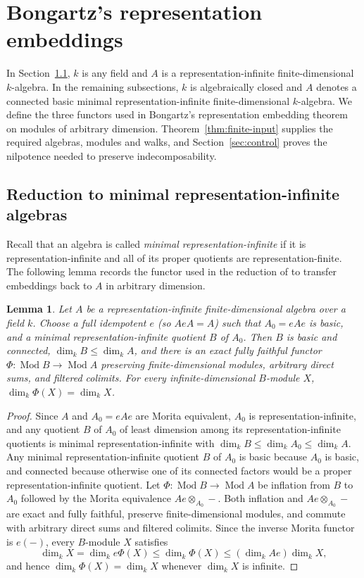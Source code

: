 \documentclass[a4paper,reqno,10pt]{amsart}
\newtheorem{lemma}[theorem]{Lemma}
\theoremstyle{definition}
\DeclareMathOperator{\Mod}{Mod}
\newcommand{\dm}{\dim_k}
\numberwithin{equation}{section}
\begin{document}
\section{Bongartz's representation embeddings}
\label{sec:constructions}
In Section~\ref{sec:reduction}, $k$ is any field and $A$ is a
representation-infinite finite-dimensional $k$-algebra. In the remaining
subsections, $k$ is algebraically closed and $A$ denotes a connected basic
minimal representation-infinite finite-dimensional $k$-algebra.
We define the three functors used in Bongartz's representation embedding
theorem \cite[Theorem~6]{Bongartz} on modules of arbitrary dimension.
Theorem~\ref{thm:finite-input} supplies the required algebras, modules and walks, and
Section~\ref{sec:control} proves the nilpotence needed to preserve
indecomposability.

\subsection{Reduction to minimal representation-infinite algebras}
\label{sec:reduction}
Recall that an algebra is called \emph{minimal representation-infinite}
if it is representation-infinite and all of its proper quotients are
representation-finite.
The following lemma records the functor used in the reduction of
\cite[\S5.2]{Bongartz} to transfer
embeddings back to $A$ in arbitrary dimension.

\begin{lemma}\label{lem:reduction}
Let $A$ be a representation-infinite finite-dimensional algebra over a
field $k$. Choose a full idempotent $e$ (so $AeA=A$) such that $A_0=eAe$ is basic,
and a minimal representation-infinite quotient $B$ of $A_0$.
Then $B$ is basic and connected, $\dm B\le\dm A$, and there is an
exact fully faithful functor $\Phi:\Mod B\to\Mod A$ preserving
finite-dimensional modules, arbitrary direct sums, and filtered
colimits. For every infinite-dimensional $B$-module $X$,
$\dm\Phi(X)=\dm X$.
\end{lemma}
\begin{proof}
Since $A$ and $A_0=eAe$ are Morita equivalent, $A_0$ is representation-infinite, and any quotient $B$ of $A_0$ of least dimension among its
representation-infinite quotients is minimal
representation-infinite with $\dm B\le\dm A_0\le\dm A$. Any minimal
representation-infinite quotient $B$ of $A_0$ is basic because $A_0$ is basic, and
connected because otherwise one of its connected factors would be a proper
representation-infinite quotient. Let $\Phi:\Mod B\to\Mod A$ be inflation from $B$ to $A_0$
followed by the Morita equivalence $Ae\otimes_{A_0}-$.
Both inflation and $Ae\otimes_{A_0}-$ are exact and fully faithful, preserve finite-dimensional modules, and
commute with arbitrary direct sums and filtered colimits. Since the inverse Morita functor is $e(-)$, every $B$-module $X$ satisfies
\[
 \dm X=\dm e\Phi(X)\le\dm\Phi(X)\le(\dm Ae)\dm X,
\]
and hence $\dm\Phi(X)=\dm X$ whenever $\dm X$ is infinite.
\end{proof}
\end{document}
